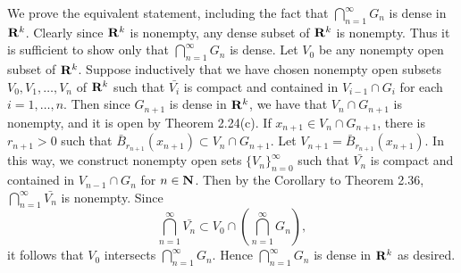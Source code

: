 \begin{ex}
[TODO]
\end{ex}

\begin{ex}
We prove the equivalent statement, including the fact that $\bigcap_{n = 1}^{\infty}G_n$ is dense in $\mathbf{R}^k$. Clearly since $\mathbf{R}^k$ is nonempty, any dense subset of $\mathbf{R}^k$ is nonempty. Thus it is sufficient to show only that $\bigcap_{n = 1}^{\infty}G_n$ is dense. Let $V_0$ be any nonempty open subset of $\mathbf{R}^k$. Suppose inductively that we have chosen nonempty open subsets $V_0, V_1, \ldots, V_n$ of $\mathbf{R}^k$ such that $\bar{V_i}$ is compact and contained in $V_{i-1}\cap G_i$ for each $i = 1, \ldots, n$. Then since $G_{n+1}$ is dense in $\mathbf{R}^k$, we have that $V_n\cap G_{n+1}$ is nonempty, and it is open by Theorem 2.24(c). If $x_{n+1} \in V_n\cap G_{n+1}$, there is $r_{n+1} > 0$ such that $\bar{B}_{r_{n+1}}(x_{n+1}) \subset V_n\cap G_{n+1}$. Let $V_{n+1} = \bar{B}_{r_{n+1}}(x_{n+1})$. In this way, we construct nonempty open sets $\{V_n\}_{n = 0}^{\infty}$ such that $\bar{V_n}$ is compact and contained in $V_{n-1}\cap G_n$ for $n \in \mathbf{N}$. Then by the Corollary to Theorem 2.36, $\bigcap_{n = 1}^{\infty}\bar{V_n}$ is nonempty. Since \[\bigcap_{n = 1}^{\infty}\bar{V_n} \subset V_0\cap\left(\bigcap_{n = 1}^{\infty}G_n\right),\] it follows that $V_0$ intersects $\bigcap_{n = 1}^{\infty}G_n$. Hence $\bigcap_{n = 1}^{\infty}G_n$ is dense in $\mathbf{R}^k$ as desired.
\end{ex}